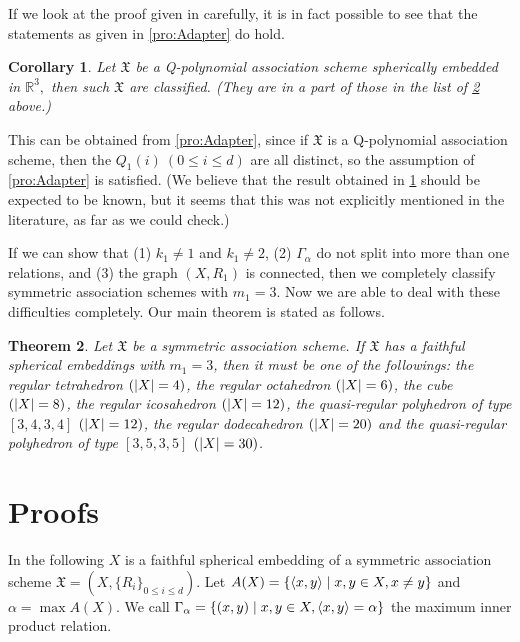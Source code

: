 \documentclass[12pt]{amsart}
\newtheorem{theorem}{Theorem}
\newtheorem{corollary}[theorem]{Corollary}
\DeclarePairedDelimiter{\set}{\{}{\}}
\DeclarePairedDelimiter{\abs}{\vert}{\vert}
\begin{document}
If we look at the proof given in \cite{MR2212140} carefully, it is in fact possible to see that the statements as given in \cref{pro:Adapter} do hold.

\begin{corollary} \label{coro:Dentist}
Let $\mathfrak X$ be a Q-polynomial association scheme 
spherically embedded in $\mathbb R^3,$ then such $\mathfrak X$ are classified. 
(They are in a part of those in the list of \cref{thm:Rest} above.) 
\end{corollary}

This can be obtained from \cref{pro:Adapter}, since if $\mathfrak X$ is a Q-polynomial association scheme, then the $Q_1(i) ~ (0\leq i\leq d)$ are all distinct, so the assumption of \cref{pro:Adapter} is satisfied. 
(We believe that the result obtained in \cref{coro:Dentist} should be expected to be known, 
but it seems that this was not explicitly mentioned in the literature, as far as we could check.) 



If we can show that (1) $k_1 \neq 1$ and $k_1 \neq 2$, (2) $\Gamma_\alpha$ do not split into more than one relations, and (3) the graph $(X,R_1)$ is connected, then we completely classify symmetric association schemes with $m_1 = 3$.
Now we are able to deal with these difficulties completely. Our main theorem is stated as follows.

\begin{theorem} \label{thm:Rest}
Let $\mathfrak X$ be a symmetric association scheme. If $\mathfrak X$ has a faithful spherical embeddings with $m_1=3$, then it must be one of the followings: the regular tetrahedron $(\abs{X}=4)$, the regular octahedron $(\abs{X}=6)$, the cube $(\abs{X}=8)$, the regular icosahedron $(\abs{X}=12)$, the quasi-regular polyhedron of type $[3,4,3,4]$ $(\abs{X}=12)$, the regular dodecahedron $(\abs{X}=20)$ and the quasi-regular polyhedron of type $[3,5,3,5]$ $(\abs{X}=30)$.
\end{theorem}




\section{Proofs}

	In the following $X$ is a faithful spherical embedding of a symmetric association scheme $\mathfrak X=(X,\{R_i\}_{0\leq i\leq d})$. 
	Let $A(X) = \set*{ \langle x,y \rangle \mid x,y \in X, x \neq y}$ and $\alpha = \max A(X)$. 
	We call $\Gamma_\alpha = \set*{ (x,y) \mid x,y \in X, \langle x,y\rangle = \alpha}$ the maximum inner product relation. 
		
\end{document}
